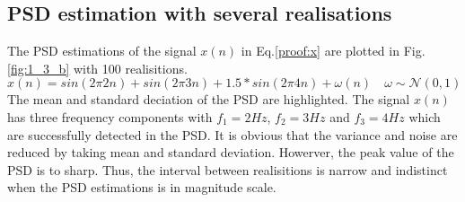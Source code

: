\subsection{PSD estimation with several realisations}
The PSD estimations of the signal $x(n)$ in Eq.\ref{proof:x} are plotted in Fig.\ref{fig:1_3_b} with 100 realisitions.
\begin{equation}
x(n)=sin(2\pi2n)+sin(2\pi3n)+1.5*sin(2\pi4n)+ \omega (n) \quad \omega \sim \mathcal{N} (0,1)
\label{proof:x}
\end{equation}
The mean and standard deciation of the PSD are highlighted. The signal $x(n)$ has three frequency components with $f_1=2 Hz$, $f_2=3 Hz$ and $f_3=4Hz$ which are successfully detected in the PSD. It is obvious that the variance and noise are reduced by taking mean and standard deviation. Howerver, the peak value of the PSD is to sharp. Thus, the interval between realisitions is narrow and indistinct when the PSD estimations is in magnitude scale.
